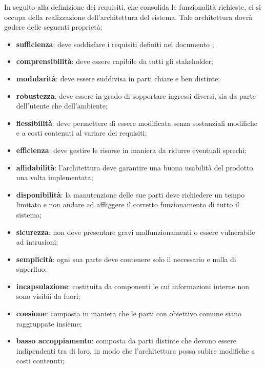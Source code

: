     	In seguito alla definizione dei requisiti, che consolida le funzionalità richieste, ci si occupa della realizzazione dell'architettura del sistema. Tale architettura dovrà godere delle seguenti proprietà: 
    	\begin{itemize}
    		\item{\textbf{sufficienza}}: deve soddisfare i requisiti definiti nel documento \AdR; 
    		\item{\textbf{comprensibilità}}: deve essere capibile da tutti gli stakeholder; 
    		\item{\textbf{modularità}}: deve essere suddivisa in parti chiare e ben distinte; 
    		\item{\textbf{robustezza}}: deve essere in grado di sopportare ingressi diversi, sia da parte dell'utente che dell'ambiente; 
    		\item{\textbf{flessibilità}}: deve permettere di essere modificata senza sostanziali modifiche e a costi contenuti al variare dei requisiti; 
    		\item{\textbf{efficienza}}: deve gestire le risorse in maniera da ridurre eventuali sprechi; 
    		\item{\textbf{affidabilità}}: l'architettura deve garantire una buona usabilità del prodotto una volta implementata; 
    		\item{\textbf{disponibilità}}: la manutenzione delle sue parti deve richiedere un tempo limitato e non andare ad affliggere il corretto funzionamento di tutto il sistema;
    		\item{\textbf{sicurezza}}: non deve presentare gravi malfunzionamenti o essere vulnerabile ad intrusioni; 
    		\item{\textbf{semplicità}}: ogni sua parte deve contenere solo il necessario e nulla di superfluo; 
    		\item{\textbf{incapsulazione}}: costituita da componenti le cui informazioni interne non sono visibii da fuori;
    		\item{\textbf{coesione}}: composta in maniera che le parti con obiettivo comune siano raggruppate insieme; 
    		\item{\textbf{basso accoppiamento}}: composta da parti distinte che devono essere indipendenti tra di loro, in modo che l'architettura possa subire modifiche a costi contenuti;   
    	\end{itemize}
  
